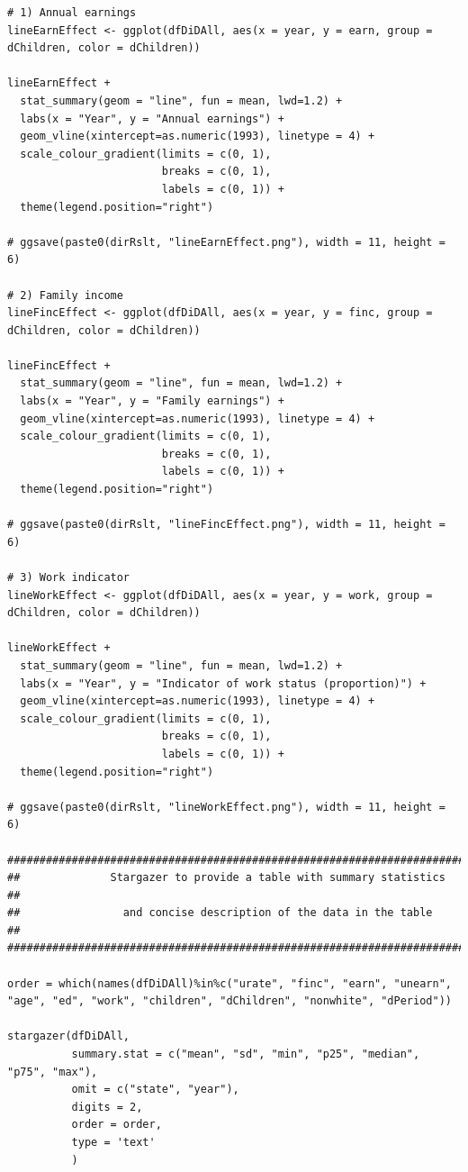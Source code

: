 \documentclass{article}
\begin{document}
\begin{tiny}
\begin{verbatim}
# 1) Annual earnings
lineEarnEffect <- ggplot(dfDiDAll, aes(x = year, y = earn, group = dChildren, color = dChildren))

lineEarnEffect + 
  stat_summary(geom = "line", fun = mean, lwd=1.2) +
  labs(x = "Year", y = "Annual earnings") +
  geom_vline(xintercept=as.numeric(1993), linetype = 4) +
  scale_colour_gradient(limits = c(0, 1), 
                        breaks = c(0, 1),
                        labels = c(0, 1)) +
  theme(legend.position="right")

# ggsave(paste0(dirRslt, "lineEarnEffect.png"), width = 11, height = 6)

# 2) Family income
lineFincEffect <- ggplot(dfDiDAll, aes(x = year, y = finc, group = dChildren, color = dChildren))

lineFincEffect + 
  stat_summary(geom = "line", fun = mean, lwd=1.2) +
  labs(x = "Year", y = "Family earnings") +
  geom_vline(xintercept=as.numeric(1993), linetype = 4) +
  scale_colour_gradient(limits = c(0, 1), 
                        breaks = c(0, 1),
                        labels = c(0, 1)) +
  theme(legend.position="right")

# ggsave(paste0(dirRslt, "lineFincEffect.png"), width = 11, height = 6)

# 3) Work indicator
lineWorkEffect <- ggplot(dfDiDAll, aes(x = year, y = work, group = dChildren, color = dChildren))

lineWorkEffect + 
  stat_summary(geom = "line", fun = mean, lwd=1.2) +
  labs(x = "Year", y = "Indicator of work status (proportion)") +
  geom_vline(xintercept=as.numeric(1993), linetype = 4) +
  scale_colour_gradient(limits = c(0, 1), 
                        breaks = c(0, 1),
                        labels = c(0, 1)) +
  theme(legend.position="right")

# ggsave(paste0(dirRslt, "lineWorkEffect.png"), width = 11, height = 6)

##################################################################################
##              Stargazer to provide a table with summary statistics            ##
##                and concise description of the data in the table              ##
##################################################################################

order = which(names(dfDiDAll)%in%c("urate", "finc", "earn", "unearn", "age", "ed", "work", "children", "dChildren", "nonwhite", "dPeriod"))

stargazer(dfDiDAll, 
          summary.stat = c("mean", "sd", "min", "p25", "median", "p75", "max"), 
          omit = c("state", "year"), 
          digits = 2,
          order = order,
          type = 'text'
          )



\end{verbatim}
\end{tiny}
\end{document}
